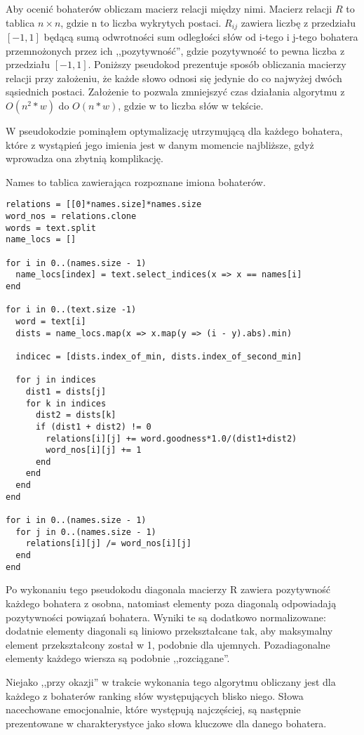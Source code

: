 \documentclass[10pt,a4paper]{article}
\begin{document}
		Aby ocenić bohaterów obliczam macierz relacji między nimi. Macierz relacji $R$ to tablica $n \times n$, gdzie n to liczba wykrytych postaci. $R_{ij}$ zawiera liczbę z przedziału $[-1,1]$ będącą sumą odwrotności sum odległości słów od i-tego i j-tego bohatera przemnożonych przez ich ,,pozytywność'', gdzie pozytywność to pewna liczba z przedziału $[-1,1]$. Poniższy pseudokod prezentuje sposób obliczania macierzy relacji przy założeniu, że każde słowo odnosi się jedynie do co najwyżej dwóch sąsiednich postaci. Założenie to pozwala zmniejszyć czas działania algorytmu z $O(n^2*w)$ do $O(n*w)$, gdzie w to liczba słów w tekście.

		W pseudokodzie pominąłem optymalizację utrzymującą dla każdego bohatera, które z wystąpień jego imienia jest w danym momencie najbliższe, gdyż wprowadza ona zbytnią komplikację.

		Names to tablica zawierająca rozpoznane imiona bohaterów.

\begin{verbatim}
relations = [[0]*names.size]*names.size
word_nos = relations.clone
words = text.split
name_locs = []

for i in 0..(names.size - 1)
  name_locs[index] = text.select_indices(x => x == names[i]
end

for i in 0..(text.size -1)
  word = text[i]
  dists = name_locs.map(x => x.map(y => (i - y).abs).min)

  indicec = [dists.index_of_min, dists.index_of_second_min]

  for j in indices
    dist1 = dists[j]
    for k in indices
      dist2 = dists[k]
      if (dist1 + dist2) != 0
        relations[i][j] += word.goodness*1.0/(dist1+dist2)
        word_nos[i][j] += 1
      end
    end
  end
end

for i in 0..(names.size - 1)
  for j in 0..(names.size - 1)
    relations[i][j] /= word_nos[i][j]
  end
end
\end{verbatim}

		Po wykonaniu tego pseudokodu diagonala macierzy R zawiera pozytywność każdego bohatera z osobna, natomiast elementy poza diagonalą odpowiadają pozytywności powiązań bohatera. Wyniki te są dodatkowo normalizowane: dodatnie elementy diagonali są liniowo przekształcane tak, aby maksymalny element przekształcony został w 1, podobnie dla ujemnych. Pozadiagonalne elementy każdego wiersza są podobnie ,,rozciągane''.

		Niejako ,,przy okazji'' w trakcie wykonania tego algorytmu obliczany jest dla każdego z bohaterów ranking słów występujących blisko niego. Słowa nacechowane emocjonalnie, które występują najczęściej, są następnie prezentowane w charakterystyce jako słowa kluczowe dla danego bohatera.
\end{document}
